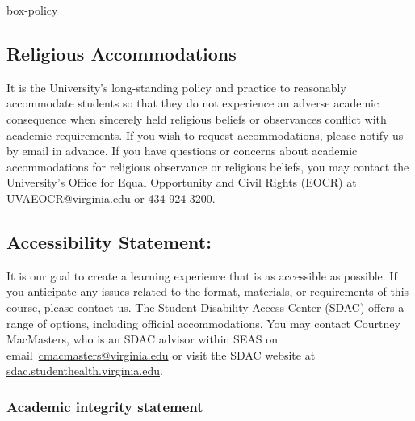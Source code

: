 \documentclass[11pt, a4paper]{article}
\begin{document}
\begin{BlockClass}{box-policy}

\subsection*{Religious Accommodations}
It is the University's long-standing policy and practice to reasonably accommodate students so that they do not experience an adverse academic consequence when sincerely held religious beliefs or observances conflict with academic requirements. If you wish to request accommodations, please notify us by email in advance. If you have questions or concerns about academic accommodations for religious observance or religious beliefs, you may contact the University's Office for Equal Opportunity and Civil Rights (EOCR) at \href{mailto:UVAEOCR@virginia.edu}{UVAEOCR@virginia.edu} or 434-924-3200.

\subsection*{Accessibility Statement:}
It is our goal to create a learning experience that is as accessible as possible. If you anticipate any issues related to the format, materials, or requirements of this course, please contact us. The Student Disability Access Center (SDAC) offers a range of options, including official accommodations. You may contact Courtney MacMasters, who is an SDAC advisor within SEAS on email~\href{mailto:cmacmasters@virginia.edu}{cmacmasters@virginia.edu} or visit the SDAC website at \url{sdac.studenthealth.virginia.edu}. 

\subsubsection*{Academic integrity statement}


\end{BlockClass}
\end{document}
